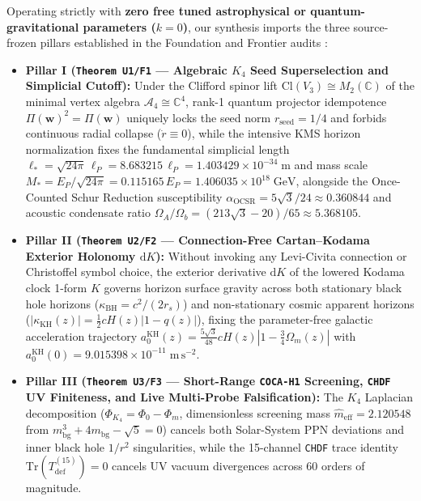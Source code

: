 \documentclass[11pt,a4paper]{article}
\theoremstyle{remark}
\begin{document}
Operating strictly with \textbf{zero free tuned astrophysical or quantum-gravitational parameters ($k = 0$)}, our synthesis imports the three source-frozen pillars established in the Foundation and Frontier audits \cite{JolcsakTauFoundationSeries2026}:
\begin{itemize}
  \item \textbf{Pillar I (\texttt{Theorem U1/F1} --- Algebraic $K_4$ Seed Superselection and Simplicial Cutoff):} Under the Clifford spinor lift $\mathrm{Cl}(V_3) \cong M_2(\mathbb{C})$ of the minimal vertex algebra $\mathcal{A}_4 \cong \mathbb{C}^4$, rank-1 quantum projector idempotence $\Pi(\mathbf{w})^2 = \Pi(\mathbf{w})$ uniquely locks the seed norm $r_{\mathrm{seed}} = 1/4$ and forbids continuous radial collapse ($\dot{r} \equiv 0$), while the intensive KMS horizon normalization fixes the fundamental simplicial length $\ell_* = \sqrt{24\pi}\,\ell_P = 8.683215\,\ell_P = 1.403429 \times 10^{-34}\;\mathrm{m}$ and mass scale $M_* = E_P/\sqrt{24\pi} = 0.115165\,E_P = 1.406035 \times 10^{18}\;\mathrm{GeV}$, alongside the Once-Counted Schur Reduction susceptibility $\alpha_{\mathrm{OCSR}} = 5\sqrt{3}/24 \approx 0.360844$ and acoustic condensate ratio $\Omega_A/\Omega_b = (213\sqrt{3}-20)/65 \approx 5.368105$.
  \item \textbf{Pillar II (\texttt{Theorem U2/F2} --- Connection-Free Cartan--Kodama Exterior Holonomy $\mathrm{d}K$):} Without invoking any Levi-Civita connection or Christoffel symbol choice, the exterior derivative $\mathrm{d}K$ of the lowered Kodama clock 1-form $K$ governs horizon surface gravity across both stationary black hole horizons ($\kappa_{\mathrm{BH}} = c^2/(2r_s)$) and non-stationary cosmic apparent horizons ($|\kappa_{\mathrm{KH}}(z)| = \frac{1}{2}cH(z)|1 - q(z)|$), fixing the parameter-free galactic acceleration trajectory $a_0^{\mathrm{KH}}(z) = \frac{5\sqrt{3}}{48}cH(z)|1 - \frac{3}{4}\Omega_m(z)|$ with $a_0^{\mathrm{KH}}(0) = 9.015398 \times 10^{-11}\;\mathrm{m\,s^{-2}}$.
  \item \textbf{Pillar III (\texttt{Theorem U3/F3} --- Short-Range \texttt{COCA-H1} Screening, \texttt{CHDF} UV Finiteness, and Live Multi-Probe Falsification):} The $K_4$ Laplacian decomposition ($\Phi_{K_4} = \Phi_0 - \Phi_m$, dimensionless screening mass $\hat{m}_{\mathrm{eff}} = 2.120548$ from $m_{\mathrm{bg}}^3 + 4m_{\mathrm{bg}} - \sqrt{5} = 0$) cancels both Solar-System PPN deviations and inner black hole $1/r^2$ singularities, while the 15-channel \texttt{CHDF} trace identity $\mathrm{Tr}(T_{\mathrm{def}}^{(15)}) = 0$ cancels UV vacuum divergences across 60 orders of magnitude.
\end{itemize}
\end{document}
